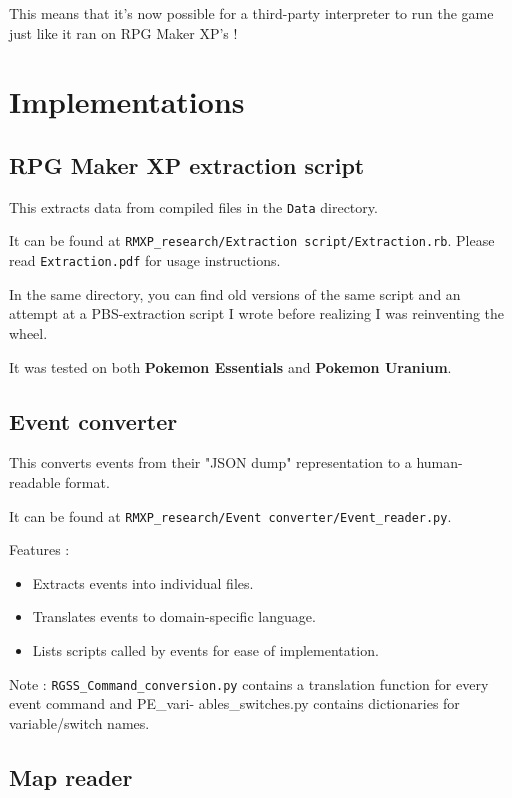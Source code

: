 \documentclass[11pt]{article}
\begin{document}
This means that it's now possible for a third-party interpreter to run the game just like it ran on RPG Maker XP's !


\newpage
\section{Implementations}

\subsection{RPG Maker XP extraction script}

This extracts data from compiled files in the \verb|Data| directory.

It can be found at \verb|RMXP_research/Extraction script/Extraction.rb|. Please read \verb|Extraction.pdf| for usage instructions.

In the same directory, you can find old versions of the same script and an attempt at a PBS-extraction script I wrote before realizing I was reinventing the wheel.

It was tested on both \textbf{Pokemon Essentials} and \textbf{Pokemon Uranium}.

\subsection{Event converter}

This converts events from their "JSON dump" representation to a human-readable format.

It can be found at \verb|RMXP_research/Event converter/Event_reader.py|.

Features :
\begin{itemize}
	\item Extracts events into individual files.
	\item Translates events to domain-specific language.
	\item Lists scripts called by events for ease of implementation.
\end{itemize}

Note : \verb|RGSS_Command_conversion.py| contains a translation function for every event command and {\ttfamily PE\_vari-
ables\_switches.py} contains dictionaries for variable/switch names.

\subsection{Map reader}
\end{document}
